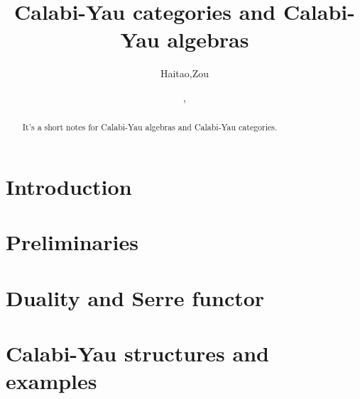 \documentclass[12pt,twoside]{article}
\title{Calabi-Yau categories and Calabi-Yau algebras}
\date{\number\year, \semester}
\author{Haitao,Zou}
\begin{document}
\maketitle
\begin{abstract}
    It's a short notes for Calabi-Yau algebras and Calabi-Yau categories.
\end{abstract}
%
\tableofcontents
\newpage

\section{Introduction}
	
\section{Preliminaries}
	
\section{Duality and Serre functor}
    

\section{Calabi-Yau structures and examples}
%    
%    
\newpage


\end{document}
